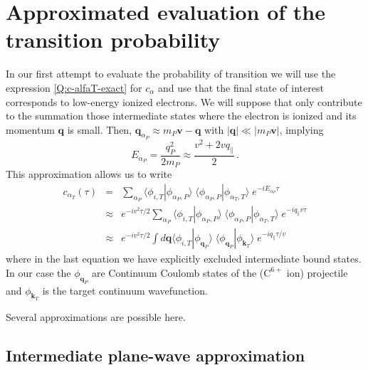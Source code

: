 \section{Approximated evaluation of the transition probability}
\label{S:Appro-evalu-trans-proba}

In our first attempt to evaluate the probability of transition we will
use the expression \ref{Q:c-alfaT-exact} for $c_{\alpha}$ and use that
the final state of interest corresponds to low-energy ionized
electrons. We will suppose that only contribute to the summation those
intermediate states where the electron is ionized and its momentum
$\bm{q}$ is small. Then, $\bm{q}_{\alpha_{P}} \approx m_{P} \bm{v} -
\bm{q}$ with $|\bm{q}| \ll |m_{P} \bm{v}|$, implying
%
\begin{equation}\label{Q:Energ-approx-alfaP}
E_{\alpha_{P}} = \frac{q_{P}^{2}}{2 m_{P}} \approx \frac{v^{2} + 2 v
q_{\|}}{2} \, .
\end{equation}
%
This approximation allows us to write
\begin{eqnarray} \label{Q:c-alfaT-appro-1a}
c_{\alpha_{T}}(\tau) &=& \sum_{\alpha_{P}} \langle \phi_{i,T} |
\phi_{\alpha_{P},P} \rangle \; \langle \phi_{\alpha_{P},P} |
\phi_{\alpha_{T},T} \rangle \; e^{-i E_{\alpha_{P}} \tau}
\\ \label{Q:c-alfaT-appro-1b}
& \approx & e^{-i v^{2} \tau/2} \sum_{\alpha_{P}} \langle
\phi_{i,T} | \phi_{\alpha_{P},P} \rangle \; \langle \phi_{\alpha_{P},P}
| \phi_{\alpha_{T},T} \rangle \; e^{-i q_{\|} v \tau}
\\ \label{Q:c-alfaT-appro-1c}
& \approx & e^{-i v^{2} \tau/2} \int d \bm{q} \langle
\phi_{i,T} | \phi_{\bm{q}_{P}} \rangle \; \langle \phi_{\bm{q}_{P}} |
\phi_{\bm{k}_{T}} \rangle \; e^{-i q_{\|} \tau/v}
\end{eqnarray}
%
where in the last equation we have explicitly excluded intermediate
bound states. In our case the $\phi_{\bm{q}_{P}}$ are Continuum Coulomb
states of the ($\mathrm{C}^{6+}$ ion) projectile and
$\phi_{\bm{k}_{T}}$ is the target continuum wavefunction.

Several approximations are possible here.

\subsection{Intermediate plane-wave approximation}
\label{S:Inter-plane-appro}

